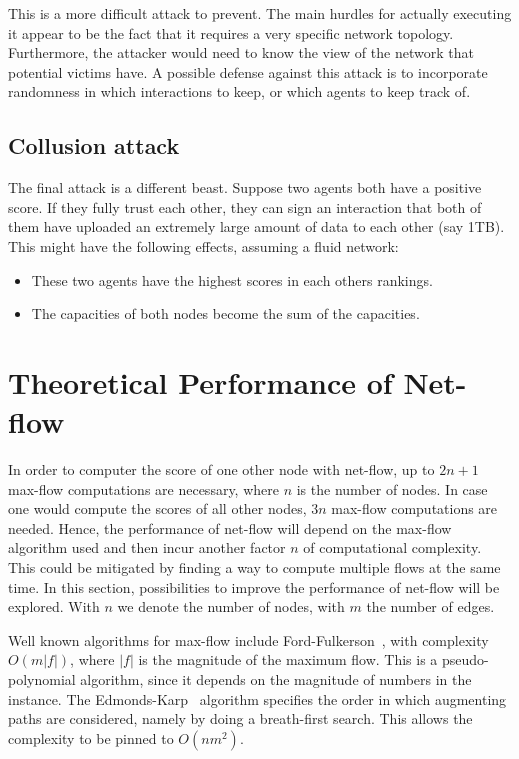 \documentclass[a4paper,11pt]{book}
\theoremstyle{definition}
\begin{document}
This is a more difficult attack to prevent. The main hurdles for actually executing it appear to be
the fact that it requires a very specific network topology. Furthermore, the attacker would need to
know the view of the network that potential victims have. A possible defense against this attack is
to incorporate randomness in which interactions to keep, or which agents to keep track of.

\subsection{Collusion attack}

The final attack is a different beast. Suppose two agents both have a positive score. If they 
fully trust each other, they can sign an interaction that both of them have uploaded an extremely large
amount of data to each other (say 1TB). This might have the following effects, assuming a fluid network:


\begin{itemize}
    \item These two agents have the highest scores in each others rankings. 
    \item The capacities of both nodes become the sum of the capacities.
\end{itemize}


\section{Theoretical Performance of Net-flow}

In order to computer the score of one other node with net-flow, up to $2n+1$ max-flow
computations are necessary, where $n$ is the number of nodes. In case one would compute
the scores of all other nodes, $3n$ max-flow computations are needed. Hence, the
performance of net-flow will depend on the max-flow algorithm used and then incur
another factor $n$ of computational complexity. This could be mitigated by finding
a way to compute multiple flows at the same time. In this section, possibilities
to improve the performance of net-flow will be explored. With $n$ we denote
the number of nodes, with $m$ the number of edges.

Well known algorithms for max-flow include Ford-Fulkerson~\cite{ford1956maximal},
with complexity $O(m|f|)$, where $|f|$ is the magnitude of the maximum flow. This
is a pseudo-polynomial algorithm, since it depends on the magnitude of numbers
in the instance.
The Edmonds-Karp~\cite{edmonds1972theoretical} algorithm specifies the order in which 
augmenting paths are considered, namely by doing a breath-first search. This allows
the complexity to be pinned to $O(nm^2)$.
\end{document}
